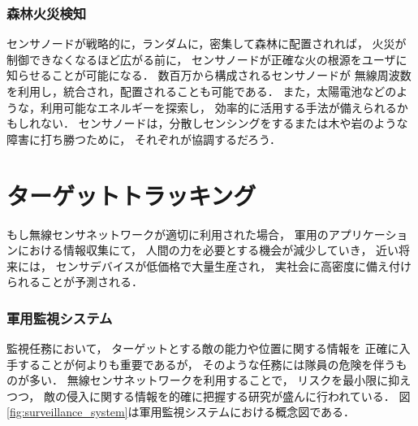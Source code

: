 \subsubsection{森林火災検知}

\vspace{0.5em}センサノードが戦略的に，ランダムに，密集して森林に配置されれば，
火災が制御できなくなるほど広がる前に，
センサノードが正確な火の根源をユーザに知らせることが可能になる．
数百万から構成されるセンサノードが
無線周波数を利用し，統合され，配置されることも可能である．
また，太陽電池などのような，利用可能なエネルギーを探索し，
効率的に活用する手法が備えられるかもしれない．
センサノードは，分散しセンシングをするまたは木や岩のような障害に打ち勝つために，
それぞれが協調するだろう．




\section{ターゲットトラッキング}
もし無線センサネットワークが適切に利用された場合，
軍用のアプリケーションにおける情報収集にて，
人間の力を必要とする機会が減少していき，
近い将来には，
センサデバイスが低価格で大量生産され，
実社会に高密度に備え付けられることが予測される．

\subsubsection{軍用監視システム}

\vspace{0.5em}監視任務において，
ターゲットとする敵の能力や位置に関する情報を
正確に入手することが何よりも重要であるが，
そのような任務には隊員の危険を伴うものが多い．
無線センサネットワークを利用することで，
リスクを最小限に抑えつつ，
敵の侵入に関する情報を的確に把握する研究が盛んに行われている．
図\ref{fig:surveillance_system}は軍用監視システムにおける概念図である．

